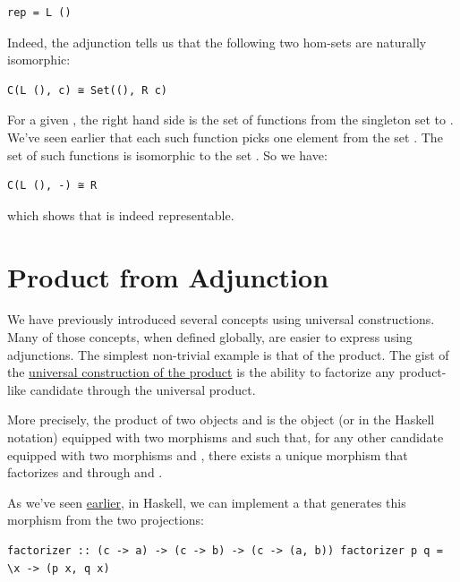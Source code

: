 \begin{verbatim}
rep = L ()
\end{verbatim}

Indeed, the adjunction tells us that the following two hom-sets are
naturally isomorphic:

\begin{verbatim}
C(L (), c) ≅ Set((), R c)
\end{verbatim}

For a given , the right hand side is the set of functions from
the singleton set \code{()} to . We've seen earlier that
each such function picks one element from the set . The set
of such functions is isomorphic to the set . So we have:

\begin{verbatim}
C(L (), -) ≅ R
\end{verbatim}

which shows that  is indeed representable.

\section{Product from Adjunction}\label{product-from-adjunction}

We have previously introduced several concepts using universal
constructions. Many of those concepts, when defined globally, are easier
to express using adjunctions. The simplest non-trivial example is that
of the product. The gist of the
\href{https://bartoszmilewski.com/2015/01/07/products-and-coproducts/}{universal
construction of the product} is the ability to factorize any
product-like candidate through the universal product.

More precisely, the product of two objects  and  is
the object  (or  in the Haskell
notation) equipped with two morphisms  and  such
that, for any other candidate  equipped with two morphisms
 and , there
exists a unique morphism  that
factorizes  and  through  and
.

As we've seen
\href{https://bartoszmilewski.com/2015/01/07/products-and-coproducts/}{earlier},
in Haskell, we can implement a  that generates this
morphism from the two projections:

\begin{verbatim}
factorizer :: (c -> a) -> (c -> b) -> (c -> (a, b)) factorizer p q = \x -> (p x, q x)
\end{verbatim}

